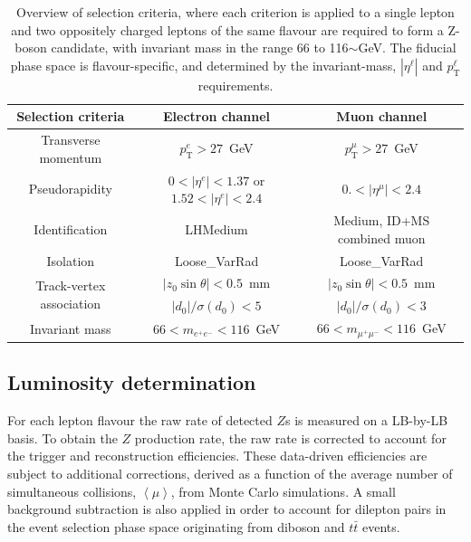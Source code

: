 \begin{table}[!htb]
	\centering
	\begin{tabular}{@{}ccc@{}}
		\toprule
		\textbf{Selection criteria}               & \textbf{Electron channel}	& \textbf{Muon channel}	 \\ \midrule
		Transverse momentum                       & $p_\text{T}^e>27$~GeV	& $p_\text{T}^\mu>27$~GeV 	\\
		Pseudorapidity                            & $0<|\eta^e|<1.37$ or $1.52<|\eta^e|<2.4$	& $0.<|\eta^\mu|<2.4$	\\
		Identification                            & LHMedium	& Medium, ID+MS combined muon	\\
		Isolation                                 & Loose\_VarRad & Loose\_VarRad \\
		\multirow{2}{*}{Track-vertex association} & $|z_0\sin\theta|<0.5$~mm & $|z_0\sin\theta|<0.5$~mm \\
		& $|d_0|/\sigma(d_0)<5$	& $|d_0|/\sigma(d_0)<3$                                      \\
		Invariant mass                            & $66<m_{e^+e^-}<116$~GeV & $66<m_{\mu^+\mu^-}<116$~GeV \\ \bottomrule
	\end{tabular}
	\caption{Overview of selection criteria, where each criterion is applied to a single lepton and two oppositely charged leptons of the same flavour are required to form a Z-boson candidate, with invariant mass in the range 66 to 116$\sim$GeV. The fiducial phase space is flavour-specific, and determined by the invariant-mass, $|\eta^\ell|$ and $p_\text{T}^\ell$ requirements.}
	\label{tab:Zcount:LeptonSele}
\end{table}

\subsection{Luminosity determination}

For each lepton flavour the raw rate of detected $Z$s is measured on a LB-by-LB basis. To obtain the $Z$ production rate, the raw rate is corrected to account for the trigger and reconstruction efficiencies. These data-driven efficiencies are subject to additional corrections, derived as a function of the average number of simultaneous collisions, $\left< \mu \right>$, from Monte Carlo simulations. A small background subtraction is also applied in order to account for dilepton pairs in the event selection phase space originating from diboson and $t\bar{t}$ events.

